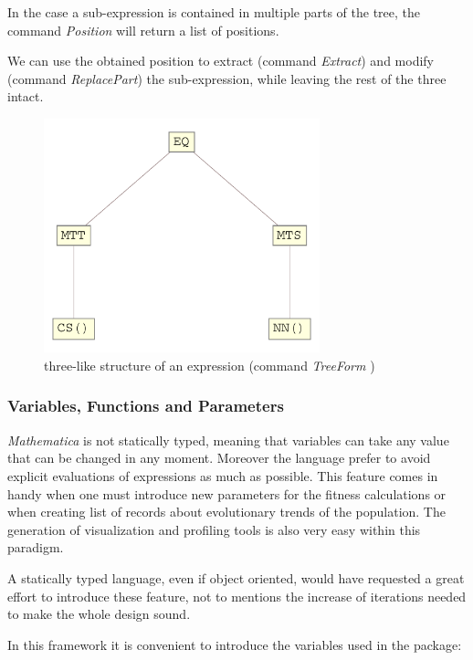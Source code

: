 \documentclass[12pt, a4paper]{article}
\begin{document}
In the case a sub-expression is contained in multiple parts of the tree, the command \textit{Position} will return a list of positions.

We can use the obtained position to extract (command \textit{Extract}) and modify (command \textit{ReplacePart}) the sub-expression, while leaving the rest of the three intact.

\begin{figure}[h]
\begin{center}
\includegraphics[width=8.0cm]{esempio_albero.pdf}
\caption{three-like structure of an expression (command 
{\itshape TreeForm} )}
\label{figure:estree}
\end{center}
\end{figure}


\subsubsection{Variables, Functions and Parameters}

\textit{Mathematica} is not statically typed, meaning that variables can take any value that can be changed in any moment. Moreover the language prefer to avoid explicit evaluations of expressions as much as possible.
This feature comes in handy when one must introduce new parameters for the fitness calculations or when creating list of records about evolutionary trends of the population. The generation of visualization and profiling tools is also very easy within this paradigm.

A statically typed language, even if object oriented, would have requested a great effort to introduce these feature, not to mentions the increase of iterations needed to make the whole design sound.

In this framework it is convenient to introduce the variables used in the package:
\end{document}
